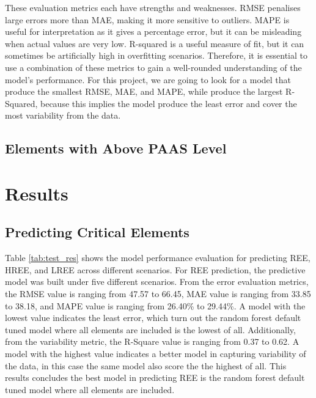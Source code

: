 \documentclass[11pt,a4paper,]{article}
\begin{document}
These evaluation metrics each have strengths and weaknesses. RMSE penalises large errors more than MAE, making it more sensitive to outliers. MAPE is useful for interpretation as it gives a percentage error, but it can be misleading when actual values are very low. R-squared is a useful measure of fit, but it can sometimes be artificially high in overfitting scenarios. Therefore, it is essential to use a combination of these metrics to gain a well-rounded understanding of the model's performance. For this project, we are going to look for a model that produce the smallest RMSE, MAE, and MAPE, while produce the largest R-Squared, because this implies the model produce the least error and cover the most variability from the data.

\subsection{Elements with Above PAAS Level}\label{elements-with-above-paas-level}

\section{Results}\label{results}

\subsection{Predicting Critical Elements}\label{predicting-critical-elements-1}

Table \ref{tab:test_res} shows the model performance evaluation for predicting REE, HREE, and LREE across different scenarios. For REE prediction, the predictive model was built under five different scenarios. From the error evaluation metrics, the RMSE value is ranging from 47.57 to 66.45, MAE value is ranging from 33.85 to 38.18, and MAPE value is ranging from 26.40\% to 29.44\%. A model with the lowest value indicates the least error, which turn out the random forest default tuned model where all elements are included is the lowest of all. Additionally, from the variability metric, the R-Square value is ranging from 0.37 to 0.62. A model with the highest value indicates a better model in capturing variability of the data, in this case the same model also score the the highest of all. This results concludes the best model in predicting REE is the random forest default tuned model where all elements are included.
\end{document}
